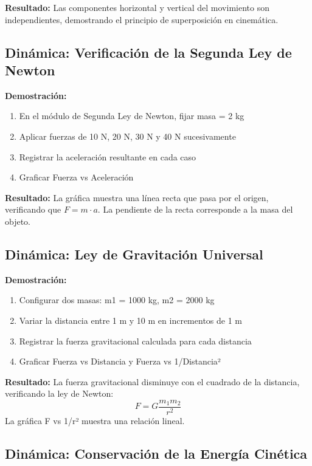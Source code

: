 \textbf{Resultado:} Las componentes horizontal y vertical del movimiento son independientes, demostrando el principio de superposición en cinemática.

\subsection{Dinámica: Verificación de la Segunda Ley de Newton}

\textbf{Demostración:}
\begin{enumerate}
    \item En el módulo de Segunda Ley de Newton, fijar masa = 2 kg
    \item Aplicar fuerzas de 10 N, 20 N, 30 N y 40 N sucesivamente
    \item Registrar la aceleración resultante en cada caso
    \item Graficar Fuerza vs Aceleración
\end{enumerate}

\textbf{Resultado:} La gráfica muestra una línea recta que pasa por el origen, verificando que $F = m \cdot a$. La pendiente de la recta corresponde a la masa del objeto.

\subsection{Dinámica: Ley de Gravitación Universal}

\textbf{Demostración:}
\begin{enumerate}
    \item Configurar dos masas: m1 = 1000 kg, m2 = 2000 kg
    \item Variar la distancia entre 1 m y 10 m en incrementos de 1 m
    \item Registrar la fuerza gravitacional calculada para cada distancia
    \item Graficar Fuerza vs Distancia y Fuerza vs 1/Distancia²
\end{enumerate}

\textbf{Resultado:} La fuerza gravitacional disminuye con el cuadrado de la distancia, verificando la ley de Newton:
\begin{equation}
F = G \frac{m_1 m_2}{r^2}
\end{equation}
La gráfica F vs 1/r² muestra una relación lineal.

\subsection{Dinámica: Conservación de la Energía Cinética}

